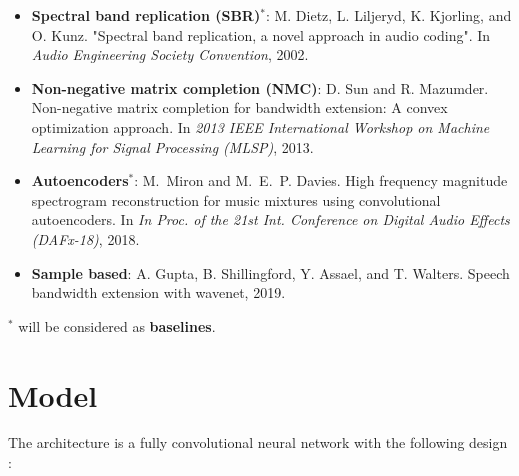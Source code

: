 \documentclass[a0,portrait,20pt]{a0poster}
\begin{document}
\begin{multicols}{2}
\begin{itemize}
  \item \textbf{Spectral band replication (SBR)$^*$}: M. Dietz, L. Liljeryd, K. Kjorling, and O. Kunz. "Spectral band replication, a novel approach in audio coding". In {\em Audio Engineering Society Convention}, 2002.
  \item \textbf{Non-negative matrix completion (NMC)}: D. Sun and R. Mazumder. Non-negative matrix completion for bandwidth extension: A convex optimization approach. In {\em 2013 IEEE International Workshop on Machine Learning for Signal Processing (MLSP)}, 2013.
  \item \textbf{Autoencoders$^*$}: M.~Miron and M.~E.~P. Davies. High frequency magnitude spectrogram reconstruction for music
    mixtures using convolutional autoencoders. In {\em In Proc. of the 21st Int. Conference on Digital Audio Effects
    (DAFx-18)}, 2018.
  \item \textbf{Sample based}: A. Gupta, B. Shillingford, Y. Assael, and T. Walters. Speech bandwidth extension with wavenet, 2019.
\end{itemize}
$^*$ will be considered as \textbf{baselines}.



\color{DarkSlateGray}

\section*{Model}
The architecture is a fully convolutional neural network with the following design :


\end{multicols}
\end{document}
